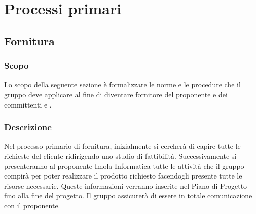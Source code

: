 \section{Processi primari}
\subsection{Fornitura}
\subsubsection{Scopo}
Lo scopo della seguente sezione è formalizzare le norme e le procedure che il gruppo \Gruppo{} deve applicare al fine di diventare fornitore del proponente \Proponente{} e dei committenti \VT{} e \CR{}.

\subsubsection{Descrizione} 
Nel processo primario di fornitura, inizialmente si cercherà di capire tutte le richieste del cliente ridirigendo uno studio di fattibilità. 
Successivamente si presenteranno al proponente Imola Informatica tutte le attività che il gruppo \Gruppo{} compirà per poter realizzare il prodotto richiesto facendogli presente tutte le risorse necessarie. Queste informazioni verranno inserite nel Piano di Progetto fino alla fine del progetto.
Il gruppo \Gruppo{} assicurerà di essere in totale comunicazione con il proponente.



